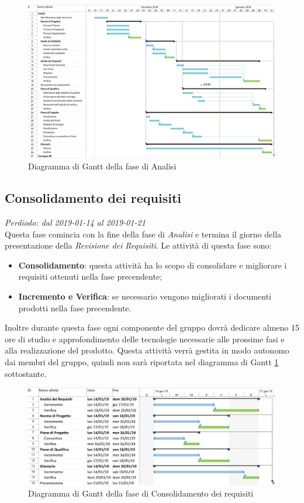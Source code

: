 \begin{figure}[H]
	\includegraphics[width=0.99\linewidth]{res/images/gantt_analisi1.jpg}
	\caption{Diagramma di Gantt della fase di Analisi}
\end{figure}



\subsection{Consolidamento dei requisiti}
\textit{Perdiodo: dal 2019-01-14 al 2019-01-21} \\
Questa fase comincia con la fine della fase di \textit{Analisi} e termina il giorno della presentazione della \textit{Revisione dei Requisiti}. Le attività di questa fase sono:
\begin{itemize}
	\item \textbf{Consolidamento}: questa attività ha lo scopo di consolidare e migliorare i requisiti ottenuti nella fase precendente;
	\item \textbf{Incremento e Verifica}: se necessario vengono migliorati i documenti prodotti nella fase precendente.
\end{itemize}
Inoltre durante questa fase ogni componente del gruppo dovrà dedicare almeno 15 
ore di studio e approfondimento delle tecnologie necessarie alle prossime fasi 
e alla realizzazione del prodotto. Questa attività verrà gestita in modo 
autonomo dai membri del gruppo, quindi non sarà riportata nel diagramma di 
Gantt \ref{fig:gantt_con} sottostante.

\begin{figure}[H]
	\label{fig:gantt_con}
	\includegraphics[width=0.99\linewidth]{res/images/gantt_cons.jpg}
	\caption{Diagramma di Gantt della fase di Consolidamento dei requisiti}
\end{figure}

